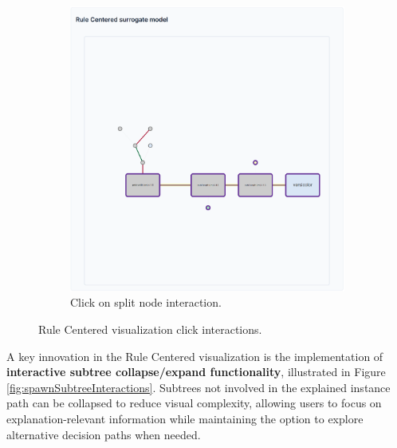 \begin{figure}
\begin{subfigure}[c]{0.48\linewidth}
        \includegraphics[width=\linewidth]{images/spawnDecisionTreeFinalSplitInteraction.png}
        \caption{Click on split node interaction.}
        \label{fig:spawnDecisionTreeFinalSplitClick}
    \end{subfigure}
    \caption{Rule Centered visualization click interactions.}
\end{figure}

A key innovation in the Rule Centered visualization is the implementation of \textbf{interactive subtree collapse/expand functionality}, illustrated in Figure \ref{fig:spawnSubtreeInteractions}. Subtrees not involved in the explained instance path can be collapsed to reduce visual complexity, allowing users to focus on explanation-relevant information while maintaining the option to explore alternative decision paths when needed.

